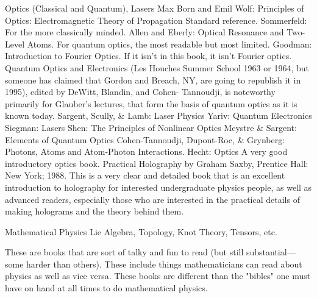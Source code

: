 \documentclass[10pt,a4paper]{book}
\theoremstyle{definition}
\begin{document}
Optics (Classical and Quantum), Lasers
Max Born and Emil Wolf: Principles of Optics: Electromagnetic Theory of Propagation
Standard reference.
Sommerfeld:
For the more classically minded.
Allen and Eberly: Optical Resonance and Two-Level Atoms.
For quantum optics, the most readable but most limited.
Goodman: Introduction to Fourier Optics.
If it isn't in this book, it isn't Fourier optics.
Quantum Optics and Electronics (Les Houches Summer School 1963 or 1964, but someone has claimed that Gordon and Breach, NY, are going to republish it in 1995), edited by DeWitt, Blandin, and Cohen- Tannoudji, is noteworthy primarily for Glauber's lectures, that form the basis of quantum optics as it is known today.
Sargent, Scully, \& Lamb: Laser Physics
Yariv: Quantum Electronics
Siegman: Lasers
Shen: The Principles of Nonlinear Optics
Meystre \& Sargent: Elements of Quantum Optics
Cohen-Tannoudji, Dupont-Roc, \& Grynberg: Photons, Atoms and Atom-Photon Interactions.
Hecht: Optics
A very good introductory optics book.
Practical Holography by Graham Saxby, Prentice Hall: New York; 1988.
This is a very clear and detailed book that is an excellent introduction to holography for interested undergraduate physics people, as well as advanced readers, especially those who are interested in the practical details of making holograms and the theory behind them.



Mathematical Physics
Lie Algebra, Topology, Knot Theory, Tensors, etc.

These are books that are sort of talky and fun to read (but still substantial—some harder than others).  These include things mathematicians can read about physics as well as vice versa.  These books are different than the "bibles" one must have on hand at all times to do mathematical physics.
\end{document}
